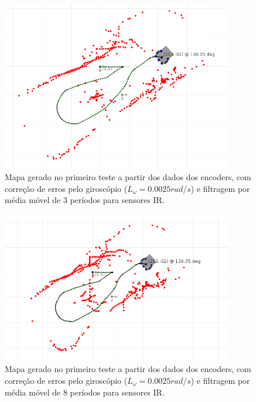 \begin{figure}[H]
	\centering
	\includegraphics[width=0.9\textwidth]{./figuras/testes/teste2/mapa_encoders_giro_media3.png}
	\caption{Mapa gerado no primeiro teste a partir dos dados dos encoders, com correção de erros pelo giroscópio ($L_\omega = 0.0025 \unit{rad/s}$) e filtragem por média móvel de 3 períodos para sensores IR.}
	\label{fig:teste2_mapa_encoders_giro_media3}
\end{figure}

\begin{figure}[H]
	\centering
	\includegraphics[width=0.9\textwidth]{./figuras/testes/teste2/mapa_encoders_giro_media8.png}
	\caption{Mapa gerado no primeiro teste a partir dos dados dos encoders, com correção de erros pelo giroscópio ($L_\omega = 0.0025 \unit{rad/s}$) e filtragem por média móvel de 8 períodos para sensores IR.}
	\label{fig:teste2_mapa_encoders_giro_media8}
\end{figure}

